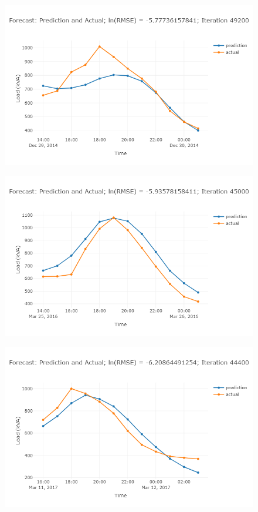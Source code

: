 \begin{figure}
\centering
\includegraphics[width=0.95\linewidth]{"images/prelim-plots/newplot (3)"}
\caption{}
\end{figure}

\begin{figure}
\centering
\includegraphics[width=0.95\linewidth]{"images/prelim-plots/newplot (4)"}
\caption{}
\end{figure}

\begin{figure}
\centering
\includegraphics[width=0.95\linewidth]{"images/prelim-plots/newplot (5)"}
\caption{}
\end{figure}

